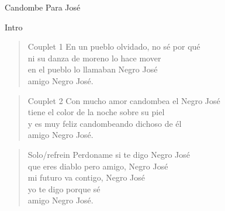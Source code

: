 \begin{song}[vals]{Candombe Para José}
\begin{instrumental}{Intro}
\measure{}\measure{}\measure{}\measure{}\measure{}\measure{}
\end{instrumental}

\begin{verse}{Couplet 1}
En un pueblo olvidado, no sé por qué\\
ni su danza de moreno lo hace mover\\
en el pueblo lo llamaban Negro José\\
amigo Negro José.  \hspace{1em}\\
\end{verse}

\begin{verse}{Couplet 2}
Con mucho amor candombea el Negro José\\
tiene el color de la noche sobre su piel\\
y es muy feliz candombeando dichoso de él\\
amigo Negro José. \hspace{1em}\\
\end{verse}

\begin{verse}{Solo/refrein}
Perdoname si te digo Negro José\\
que eres diablo pero amigo, Negro José\\
mi futuro va contigo, Negro José\\
yo te digo porque sé  \\
amigo Negro José. \\
\end{verse}



\end{song}
